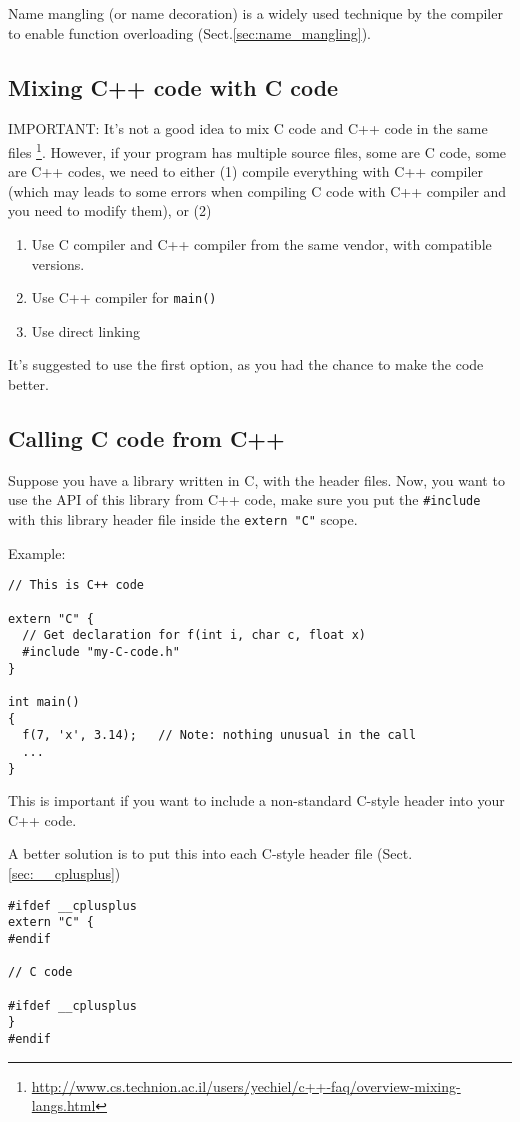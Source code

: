 Name mangling (or name decoration) is a widely used technique by the compiler to
enable function overloading (Sect.\ref{sec:name_mangling}). 

\subsection{Mixing C++ code with C code}

IMPORTANT: It's not a good idea to mix C code and C++ code in the same files
\footnote{\url{http://www.cs.technion.ac.il/users/yechiel/c++-faq/overview-mixing-langs.html}}.
However, if your program has multiple source files, some are C code, some are
C++ codes, we need to either (1) compile everything with C++ compiler (which
may leads to some errors when compiling C code with C++ compiler and you need to
modify them), or (2)
\begin{enumerate}
  \item Use C compiler and C++ compiler from the same vendor, with compatible
  versions.
  \item Use C++ compiler for \verb!main()!
  \item Use direct linking 
\end{enumerate}
It's suggested to use the first option, as you had the chance to make the code
better.

\subsection{Calling C code from C++}
\label{sec:C-code-callable-from-C-and-C++}

Suppose you have a library written in C, with the header files.
Now, you want to use the API of this library from C++ code, 
make sure you put the \verb!#include! with this library header file
inside the \verb!extern "C"! scope.

Example:
\begin{verbatim}
// This is C++ code

extern "C" {
  // Get declaration for f(int i, char c, float x)
  #include "my-C-code.h"
}

int main()
{
  f(7, 'x', 3.14);   // Note: nothing unusual in the call
  ...
}
\end{verbatim}
This is important if you want to include a non-standard C-style header into your
C++ code.

A better solution is to put this into each C-style header file
(Sect.\ref{sec:__cplusplus})
\begin{verbatim}
#ifdef __cplusplus
extern "C" {
#endif

// C code

#ifdef __cplusplus
}
#endif

\end{verbatim}

